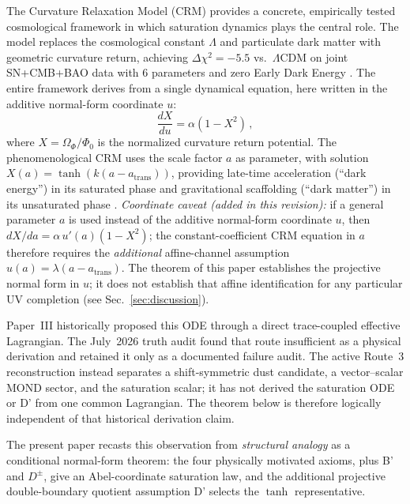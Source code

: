 \documentclass[aps,prd,twocolumn,superscriptaddress,nofootinbib]{revtex4-2}
\begin{document}
The Curvature Relaxation Model (CRM) \cite{Geiger2026,Geiger2026b,Geiger2026c,Geiger2026d} provides a concrete, empirically tested cosmological framework in which saturation dynamics plays the central role. The model replaces the cosmological constant $\Lambda$ and particulate dark matter with geometric curvature return, achieving $\Delta\chi^2 = -5.5$ vs.\ $\Lambda$CDM on joint SN+CMB+BAO data with 6 parameters and zero Early Dark Energy \cite{Geiger2026b}. The entire framework derives from a single dynamical equation, here written in the additive normal-form coordinate $u$:
\begin{equation}
\frac{dX}{du} = \alpha(1 - X^2)\,,
\label{eq:saturation_ode}
\end{equation}
where $X = \Omega_\Phi/\Phi_0$ is the normalized curvature return potential. The phenomenological CRM uses the scale factor $a$ as parameter, with solution $X(a) = \tanh(k(a - a_{\mathrm{trans}}))$, providing late-time acceleration (``dark energy'') in its saturated phase and gravitational scaffolding (``dark matter'') in its unsaturated phase \cite{Geiger2026b}. \emph{Coordinate caveat (added in this revision):} if a general parameter $a$ is used instead of the additive normal-form coordinate $u$, then $dX/da = \alpha\,u'(a)(1-X^2)$; the constant-coefficient CRM equation in $a$ therefore requires the \emph{additional} affine-channel assumption $u(a) = \lambda(a - a_{\mathrm{trans}})$. The theorem of this paper establishes the projective normal form in $u$; it does not establish that affine identification for any particular UV completion (see Sec.~\ref{sec:discussion}).

Paper~III \cite{Geiger2026c} historically proposed this ODE through a direct trace-coupled effective Lagrangian. The July~2026 truth audit found that route insufficient as a physical derivation and retained it only as a documented failure audit. The active Route~3 reconstruction instead separates a shift-symmetric dust candidate, a vector--scalar MOND sector, and the saturation scalar; it has not derived the saturation ODE or D' from one common Lagrangian. The theorem below is therefore logically independent of that historical derivation claim.

The present paper recasts this observation from \textit{structural analogy} as a conditional normal-form theorem: the four physically motivated axioms, plus B' and $D^\pm$, give an Abel-coordinate saturation law, and the additional projective double-boundary quotient assumption D' selects the $\tanh$ representative.
\end{document}
